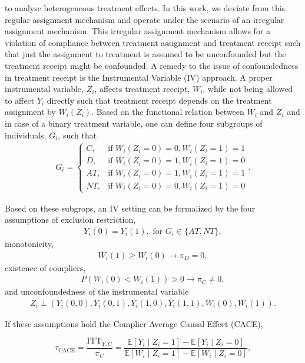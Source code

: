 to analyse heterogeneous treatment effects. In this work, we deviate from this regular assignment mechanism and operate under the scenario of an irregular assignment mechanism.
This irregular assignment mechanism allows for a violation of compliance between treatment assignment and treatment receipt such that just the assignment to treatment is assumed to be unconfounded but the treatment receipt might be confounded.
A remedy to the issue of confoundedness in treatment receipt is the Instrumental Variable (IV) approach.
A proper instrumental variable, $Z_i$, affects treatment receipt, $W_i$, while not being allowed to affect $Y_i$ directly such that treatment receipt depends on the treatment assignment by $W_i(Z_i)$.
Based on the functional relation between $W_i$ and $Z_i$ and in case of a binary treatment variable, one can define four subgroups of individuals, $G_i$, such that  
\begin{align*}
   G_i=
   \begin{cases}
      C,& \text{if } W_i(Z_i = 0) = 0, W_i(Z_i = 1) = 1 \\
      D,& \text{if } W_i(Z_i = 0) = 1, W_i(Z_i = 1) = 0 \\
      AT,& \text{if } W_i(Z_i = 0) = 1, W_i(Z_i = 1) = 1 \\
      NT,& \text{if }W_i(Z_i = 0) = 0, W_i(Z_i = 1) = 0
   \end{cases}.
\end{align*}

Based on these subgrops, an IV setting can be formalized by the four assumptions \citep{Angrist1996} of exclusion restriction, 
\begin{align}
   Y_i(0) = Y_i(1), \text{ for } G_i \in \{AT, NT \},
\end{align}
monotonicity, 
\begin{align}
   W_i(1) \geq W_i(0) \rightarrow \pi_D = 0,
\end{align}
existence of compliers, 
\begin{align}
   P(W_i(0) < W_i(1)) > 0 \rightarrow \pi_C \ne 0,
\end{align}
and unconfoundedness of the instrumental variable  
\begin{align}
   Z_i \perp (Y_i(0, 0), Y_i(0, 1), Y_i(1, 0), Y_i(1, 1), W_i(0), W_i(1)).
\end{align}

If these assumptions hold the Complier Average Causal Effect (CACE),

\[
\tau_{\text{CACE}} = \frac{\text{ITT}_{Y,C}}{\pi_C} = \frac{\mathbb{E}[Y_i \mid Z_i = 1] - \mathbb{E}[Y_i \mid Z_i = 0]}{\mathbb{E}[W_i \mid Z_i = 1] - \mathbb{E}[W_i \mid Z_i = 0]},
\tag{5}
\]

